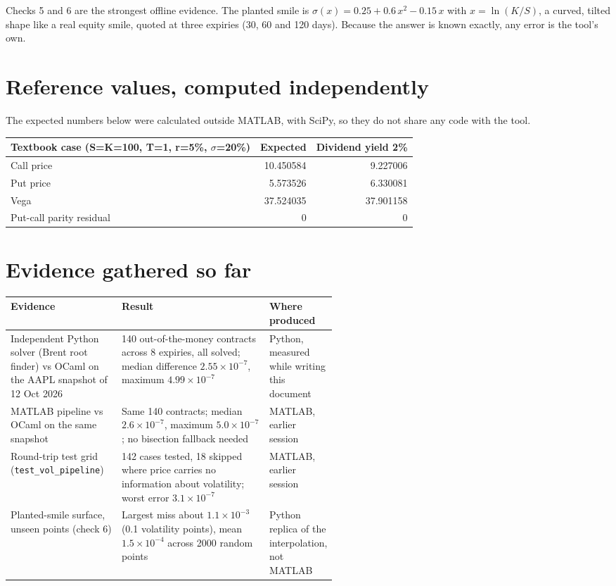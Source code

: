 \documentclass[11pt]{article}
\begin{document}
Checks 5 and 6 are the strongest offline evidence. The planted smile is $\sigma(x)=0.25+0.6\,x^2-0.15\,x$ with $x=\ln(K/S)$, a curved, tilted shape like a real equity smile, quoted at three expiries (30, 60 and 120 days). Because the answer is known exactly, any error is the tool's own.

\section{Reference values, computed independently}
The expected numbers below were calculated outside MATLAB, with SciPy, so they do not share any code with the tool.

\begin{center}
\begin{tabular}{@{}lrr@{}}
\toprule
\textbf{Textbook case (S=K=100, T=1, r=5\%, $\sigma$=20\%)} & \textbf{Expected} & \textbf{Dividend yield 2\%}\\\midrule
Call price & 10.450584 & 9.227006\\
Put price & 5.573526 & 6.330081\\
Vega & 37.524035 & 37.901158\\
Put-call parity residual & 0 & 0\\\bottomrule
\end{tabular}
\end{center}

\section{Evidence gathered so far}
\begin{tabularx}{\linewidth}{@{}>{\raggedright\arraybackslash}p{0.34\linewidth}X>{\raggedright\arraybackslash}p{0.2\linewidth}@{}}
\toprule
\textbf{Evidence} & \textbf{Result} & \textbf{Where produced}\\\midrule
Independent Python solver (Brent root finder) vs OCaml on the AAPL snapshot of 12 Oct 2026 & 140 out-of-the-money contracts across 8 expiries, all solved; median difference $2.55\times10^{-7}$, maximum $4.99\times10^{-7}$ & Python, measured while writing this document\\
MATLAB pipeline vs OCaml on the same snapshot & Same 140 contracts; median $2.6\times10^{-7}$, maximum $5.0\times10^{-7}$; no bisection fallback needed & MATLAB, earlier session\\
Round-trip test grid (\texttt{test\_vol\_pipeline}) & 142 cases tested, 18 skipped where price carries no information about volatility; worst error $3.1\times10^{-7}$ & MATLAB, earlier session\\
Planted-smile surface, unseen points (check 6) & Largest miss about $1.1\times10^{-3}$ (0.1 volatility points), mean $1.5\times10^{-4}$ across 2000 random points & Python replica of the interpolation, not MATLAB\\\bottomrule
\end{tabularx}
\end{document}

